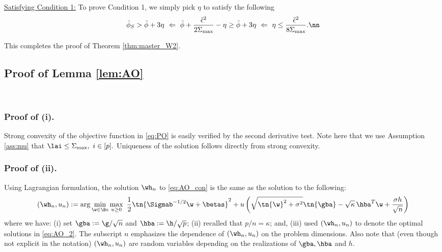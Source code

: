 \vspace{5pt}
\noindent\underline{Satisfying Condition 1:} To prove Condition 1, we simply pick $\eta$ to satisfy the following
\begin{align}
\bar\phi_S > \bar\phi + 3 \eta ~\Leftarrow~ \bar\phi + \frac{\tilde\epsilon^2}{2\Sigma_{\max}} - \eta \geq \bar\phi + 3 \eta ~\Leftarrow~ \eta \leq \frac{\tilde\epsilon^2}{8\Sigma_{\max}}.\nn
\end{align}


This completes the proof of Theorem \ref{thm:master_W2}.

\subsection{Proof of Lemma \ref{lem:AO}}\label{sec:proofAO}

~~~~
~~~~

\vp

\subsubsection{Proof of (i).} Strong convexity of the objective function in \eqref{eq:PO} is easily verified by the second derivative test. Note here that we use Assumption \ref{ass:mu} that $\lai\leq\Sigma_{\max},~i\in[p].$ Uniqueness of the solution follows directly from strong convexity. 



\vspace{5pt}
\subsubsection{Proof of (ii).}Using Lagrangian formulation, the solution $\wh_n$ to \eqref{eq:AO_con} is the same as the solution to the following:
\begin{align}
\left(\wh_n,u_n\right) :=\arg\min_{\w\in\Bc}\max_{u\geq 0} ~\frac{1}{2}\tn{\Sigmab^{-1/2}\w+\betas}^2 + u \left( \sqrt{\tn{\w}^2+\sigma^2} \tn{\gba} - \sqrt{\kappa}\,{\hba}^T\w + \frac{\sigma h}{\sqrt{n}} \right)\label{eq:AO_2}
\end{align}
where we have: (i) set $\gba := \g/\sqrt{n}$ and $\hba:= \h/\sqrt{p}$; (ii) recalled that $p/n=\kappa$; and, (iii) used $\left(\wh_n,u_n\right)$ to denote the optimal solutions in \eqref{eq:AO_2}. The subscript $n$ emphasizes the dependence of $\left(\wh_n,u_n\right)$ on the problem dimensions. Also note that (even though not explicit in the notation) $\left(\wh_n,u_n\right)$ are random variables depending on the realizations of $\gba,\hba$ and $h$.

